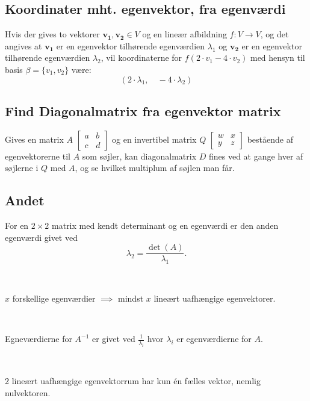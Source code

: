 \subsection{Koordinater mht. egenvektor, fra egenværdi}
Hvis der gives to vektorer $\mathbf{v_1}, \mathbf{v_2} \in V$ og en lineær afbildning $f: V \to V$, og det angives at $\mathbf{v_1}$ er en egenvektor tilhørende egenværdien $\lambda_1$ og $\mathbf{v_2}$ er en egenvektor tilhørende egenværdien $\lambda_2$, vil koordinaterne for \(f(2 \cdot v_1 - 4 \cdot v_2)\) med hensyn til basis \(\beta = \{v_1, v_2\}\) være:
\[
    (2 \cdot \lambda_1, \quad -4 \cdot \lambda_2)
\]

\subsection{Find Diagonalmatrix fra egenvektor matrix}

Gives en matrix $A$ \( \begin{bmatrix}
    a & b \\
    c & d
\end{bmatrix}
\) og en invertibel matrix $Q$ \( \begin{bmatrix}
    w & x \\
    y & z
\end{bmatrix}
\) bestående af egenvektorerne til $A$ som søjler, kan diagonalmatrix $D$ fines ved at gange hver af søjlerne i $Q$ med $A$, og se hvilket multiplum af søjlen man får.


\subsection{Andet}

For en $2 \times 2$ matrix med kendt determinant og en egenværdi er den anden egenværdi givet ved
\[\lambda_2 = \frac{\det(A)}{\lambda_1}.\]

\

$x$ forskellige egenværdier $\implies$ mindst $x$ lineært uafhængige egenvektorer.

\

Egneværdierne for $A^{-1}$ er givet ved $\frac{1}{\lambda_i}$ hvor $\lambda_i$ er egenværdierne for $A$.

\

2 lineært uafhængige egenvektorrum har kun én fælles vektor, nemlig nulvektoren.